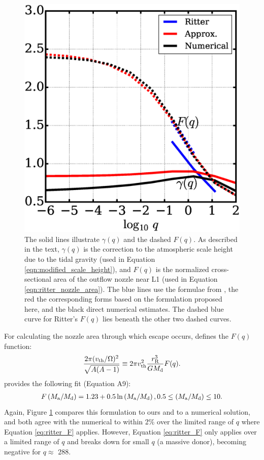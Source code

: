 \documentclass{aastex}
\newcommand{\be}{\begin{eqnarray}}
\newcommand{\ee}{\end{eqnarray}}
\begin{document}
\begin{figure}
\includegraphics[width=\textwidth]{compare_gamma-F}
\caption{The solid lines illustrate $\gamma(q)$ and the dashed $F(q)$. As described in the text, $\gamma(q)$ is the correction to the atmospheric scale height due to the tidal gravity (used in Equation \ref{eqn:modified_scale_height}), and $F(q)$ is the normalized cross-sectional area of the outflow nozzle near L1 (used in Equation \ref{eqn:ritter_nozzle_area}). The blue lines use the formulae from \citet{1988A&A...202...93R}, the red the corresponding forms based on the formulation proposed here, and the black direct numerical estimates. The dashed blue curve for Ritter's $F(q)$ lies beneath the other two dashed curves.}
\label{fig:compare_gamma-F}
\end{figure}

For calculating the nozzle area through which escape occurs, \citet{1988A&A...202...93R} defines the $F(q)$ function: 
\be
\frac{2\pi (v_{\rm th}/\Omega)^2}{ \sqrt{ A(A-1)} } \equiv 2\pi v_{\rm th}^2 \frac{r_{\rm R}^3}{GM_{\rm d}} F(q).
\label{eqn:ritter_nozzle_area}
\ee
\citet{1988A&A...202...93R} provides the following fit (Equation A9): 
\be
F\left( M_{\rm a}/M_{\rm d} \right) = 1.23 + 0.5 \ln\left( M_{\rm a}/M_{\rm d} \right), 0.5 \le \left( M_{\rm a}/M_{\rm d} \right) \le 10.
\label{eq:ritter_F}
\ee
Again, Figure \ref{fig:compare_gamma-F} compares this formulation to ours and to a numerical solution, and both agree with the numerical to within 2\% over the limited range of $q$ where Equation \ref{eq:ritter_F} applies. However, Equation \ref{eq:ritter_F} only applies over a limited range of $q$ and breaks down for small $q$ (a massive donor), becoming negative for $q \approx$ 288.
\end{document}
